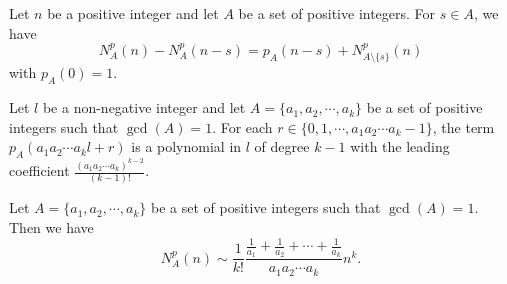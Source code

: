\documentclass[10pt,a4paper]{amsart}
\begin{document}
\begin{theorem}\label{roverA}
Let $n$ be a positive integer and let $A$ be a set of positive integers. For $s\in A$, we have
\begin{equation}
N_A^p(n)-N_A^p(n-s)=p_A(n-s)+N_{A\setminus\{s\}}^p(n)
\end{equation}
with $p_A(0)=1$.
\end{theorem}

\begin{lemma}\label{lemma2}
Let $l$ be a non-negative integer and let $A=\{a_1,a_2,\cdots ,a_k\}$ be a set of positive integers such that $\gcd(A)=1$. For each $r\in\{0,1,\cdots,a_1a_2\cdots a_k-1\}$, the term $p_A(a_1a_2\cdots a_kl+r)$ is a polynomial in $l$ of degree $k-1$ with the leading coefficient $\frac{(a_1a_2\cdots a_k)^{k-2}}{(k-1)!}$.
\end{lemma}

\begin{theorem}
Let $A=\{a_1,a_2,\cdots ,a_k\}$ be a set of positive integers such that $\gcd(A)=1$. Then we have
\begin{equation}\label{mest}
N_A^p(n)\sim\frac{1}{k!}\frac{\frac{1}{a_1}+\frac{1}{a_2}+\cdots +\frac{1}{a_k}}{a_1a_2\cdots a_k}n^k.
\end{equation}
\end{theorem}
\end{document}
